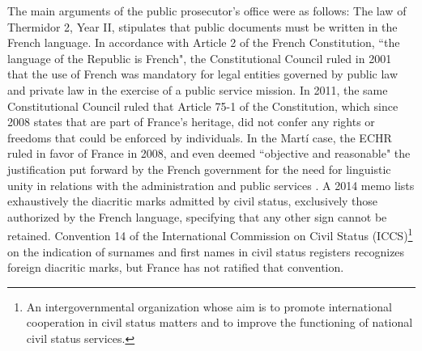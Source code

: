 \documentclass[output=paper,colorlinks,citecolor=brown]{langscibook}
\begin{document}
The main arguments of the public prosecutor's office were as follows: The law of Thermidor 2, Year II, stipulates that public documents must be written in the French language. In accordance with Article 2 of the French Constitution, ``the language of the Republic is French", the Constitutional Council \citep{sm:ConseilConstitutionnel2021} ruled in 2001 that the use of French was mandatory for legal entities governed by public law and private law in the exercise of a public service mission. In 2011, the same Constitutional Council ruled that Article 75-1 of the Constitution, which since 2008 states that  are part of France's heritage, did not confer any rights or freedoms that could be enforced by individuals. In the Martí case, the ECHR ruled in favor of France in 2008, and even deemed ``objective and reasonable" the justification put forward by the French government for the need for linguistic unity in relations with the administration and public services \citep{sm:ECHR2012}. A 2014 memo lists exhaustively the diacritic marks admitted by civil status, exclusively those authorized by the French language, specifying that any other sign cannot be retained. Convention 14 of the International Commission on Civil Status (ICCS)\footnote{An intergovernmental organization whose aim is to promote international cooperation in civil status matters and to improve the functioning of national civil status services.} on the indication of surnames and first names in civil status registers recognizes foreign diacritic marks, but France has not ratified that convention.
\end{document}
